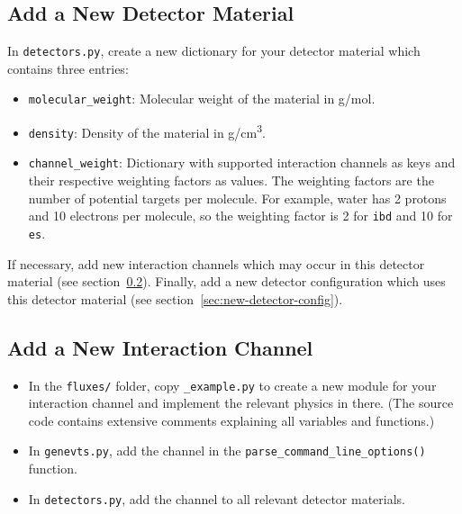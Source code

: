 \documentclass[11pt, oneside]{article}
\begin{document}
\subsection{Add a New Detector Material}\label{sec:new-detector-material}

In \texttt{detectors.py}, create a new dictionary for your detector material which contains three entries:
\begin{itemize}
\item \texttt{molecular\_weight}: Molecular weight of the material in \si{g/mol}.
\item \texttt{density}: Density of the material in \si{g/cm^3}.
\item \texttt{channel\_weight}: Dictionary with supported interaction channels as keys and their respective weighting factors as values. The weighting factors are the number of potential targets per molecule. For example, water has 2 protons and 10 electrons per molecule, so the weighting factor is 2 for \texttt{ibd} and 10 for \texttt{es}.
\end{itemize}

If necessary, add new interaction channels which may occur in this detector material (see section~\ref{sec:new-interaction-channel}).
Finally, add a new detector configuration which uses this detector material (see section~\ref{sec:new-detector-config}).

\subsection{Add a New Interaction Channel}\label{sec:new-interaction-channel}

\begin{itemize}
\item In the \texttt{fluxes/} folder, copy \texttt{\_example.py} to create a new module for your interaction channel and implement the relevant physics in there.
(The source code contains extensive comments explaining all variables and functions.)
\item In \texttt{genevts.py}, add the channel in the \texttt{parse\_command\_line\_options()} function.
\item In \texttt{detectors.py}, add the channel to all relevant detector materials.
\end{itemize}
\end{document}
